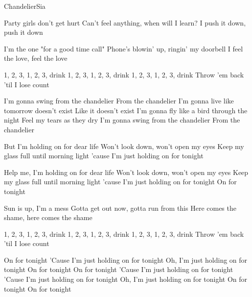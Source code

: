 \begin{Song}{Chandelier}{Sia}
\begin{multicols}{2}

\begin{Verse}
Party girls don't get hurt
Can't feel anything, when will I learn?
I push it down, push it down
\espaceInterStrophe

I'm the one "for a good time call"
Phone's blowin' up, ringin' my doorbell
I feel the love, feel the love
\end{Verse}
\espaceInterStrophe

\begin{PreChorus}
1, 2, 3, 1, 2, 3, drink
1, 2, 3, 1, 2, 3, drink
1, 2, 3, 1, 2, 3, drink
Throw 'em back 'til I lose count
\end{PreChorus}
\espaceInterStrophe

\begin{Chorus}
I'm gonna swing from the chandelier
From the chandelier
I'm gonna live like tomorrow doesn't exist
Like it doesn't exist
I'm gonna fly like a bird through the night
Feel my tears as they dry
I'm gonna swing from the chandelier
From the chandelier
\espaceInterStrophe

But I'm holding on for dear life
Won't look down, won't open my eyes
Keep my glass full until morning light
'cause I'm just holding on for tonight
\espaceInterStrophe

Help me, I'm holding on for dear life
Won't look down, won't open my eyes
Keep my glass full until morning light
'cause I'm just holding on for tonight
On for tonight
\end{Chorus}
\vfill
\columnbreak

\begin{Verse}
Sun is up, I'm a mess
Gotta get out now, gotta run from this
Here comes the shame, here comes the shame
\end{Verse}
\espaceInterStrophe

\begin{PreChorus}
1, 2, 3, 1, 2, 3, drink
1, 2, 3, 1, 2, 3, drink
1, 2, 3, 1, 2, 3, drink
Throw 'em back 'til I lose count
\end{PreChorus}
\espaceInterStrophe

\tochorus
\espaceInterStrophe

\begin{Chorus}
On for tonight
'Cause I'm just holding on for tonight
Oh, I'm just holding on for tonight
On for tonight
On for tonight
'Cause I'm just holding on for tonight
'Cause I'm just holding on for tonight
Oh, I'm just holding on for tonight
On for tonight
On for tonight
\end{Chorus}


\end{multicols}
\end{Song}

